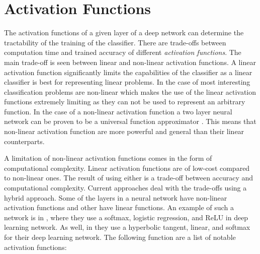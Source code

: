 \documentclass[font=12pt]{article}
\begin{document}
\section{Activation Functions}
\label{sec:activation}
The activation functions of a given layer of a deep network can determine the tractability of the training of the classifier. There are trade-offs between computation time and trained accuracy of different \emph{activation functions}. The main trade-off is seen between linear and non-linear activation functions. A linear activation function significantly limits the capabilities of the classifier as a linear classifier is best for representing linear problems. In the case of most interesting classification problems are non-linear which makes the use of the linear activation functions extremely limiting as they can not be used to represent an arbitrary function. In the case of a non-linear activation function a two layer neural network can be proven to be a universal function approximator \cite{cybenko1989approximation}. This means that non-linear activation function are more powerful and general than their linear counterparts.

A limitation of non-linear activation functions comes in the form of computational complexity. Linear activation functions are of low-cost compared to non-linear ones. The result of using either is a trade-off between accuracy and computational complexity. Current approaches deal with the trade-offs using a hybrid approach. Some of the layers in a neural network have non-linear activation functions and other have linear functions. An example of such a network is in \cite{krizhevsky2012imagenet}, where they use a softmax, logistic regression, and ReLU in deep learning network. As well, in \cite{6248110} they use a hyperbolic tangent, linear, and softmax for their deep learning network. The following function are a list of notable activation functions:
\end{document}
